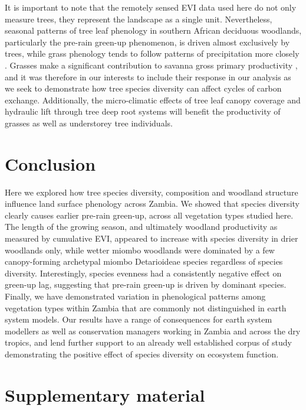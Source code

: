 \begin{refsection}
It is important to note that the remotely sensed EVI data used here do not only measure trees, they represent the landscape as a single unit. Nevertheless, seasonal patterns of tree leaf phenology in southern African deciduous woodlands, particularly the pre-rain green-up phenomenon, is driven almost exclusively by trees, while grass phenology tends to follow patterns of precipitation more closely \citep{Whitecross2017, Archibald2007, Higgins2011}. Grasses make a significant contribution to savanna gross primary productivity \citep{Lloyd2008}, and it was therefore in our interests to include their response in our analysis as we seek to demonstrate how tree species diversity can affect cycles of carbon exchange. Additionally, the micro-climatic effects of tree leaf canopy coverage and hydraulic lift through tree deep root systems will benefit the productivity of grasses as well as understorey tree individuals.

\section{Conclusion}
\label{phen:sec:conclusion}

Here we explored how tree species diversity, composition and woodland structure influence land surface phenology across Zambia. We showed that species diversity clearly causes earlier pre-rain green-up, across all vegetation types studied here. The length of the growing season, and ultimately woodland productivity as measured by cumulative EVI, appeared to increase with species diversity in drier woodlands only, while wetter miombo woodlands were dominated by a few canopy-forming archetypal miombo Detarioideae species regardless of species diversity. Interestingly, species evenness had a consistently negative effect on green-up lag, suggesting that pre-rain green-up is driven by dominant species. Finally, we have demonstrated variation in phenological patterns among vegetation types within Zambia that are commonly not distinguished in earth system models. Our results have a range of consequences for earth system modellers as well as conservation managers working in Zambia and across the dry tropics, and lend further support to an already well established corpus of study demonstrating the positive effect of species diversity on ecosystem function.

\newpage{}
\FloatBarrier{}
\begingroup
{}
\printbibliography[heading=subbibintoc]
\endgroup

\section{Supplementary material}
\label{phen:sec:supp}
\begin{supplement} 


\end{supplement}
\end{refsection}

